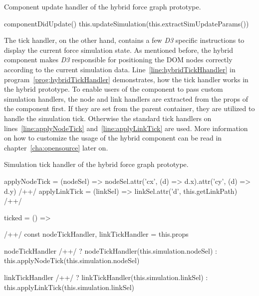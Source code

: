 \begin{program}
\caption{Component update handler of the hybrid force graph prototype.}
\label{prog:hybridUpdateHandler}
\begin{JsCode}
componentDidUpdate() {
  this.updateSimulation(this.extractSimUpdateParams())
}
\end{JsCode}
\end{program}

The tick handler, on the other hand, contains a few \emph{D3} specific instructions to display the current force simulation state. As mentioned before, the hybrid component makes \emph{D3} responsible for positioning the DOM nodes correctly according to the current simulation data. Line~\ref{line:hybridTickHhandler} in program~\ref{prog:hybridTickHandler} demonstrates, how the tick handler works in the hybrid prototype. To enable users of the component to pass custom simulation handlers, the node and link handlers are extracted from the props of the component first. If they are set from the parent container, they are utilized to handle the simulation tick. Otherwise the standard tick handlers on lines~\ref{line:applyNodeTick} and~\ref{line:applyLinkTick} are used. More information on how to customize the usage of the hybrid component can be read in chapter~\ref{cha:opensource} later on.

\begin{program}
\caption{Simulation tick handler of the hybrid force graph prototype.}
\label{prog:hybridTickHandler}
\begin{JsCode}
applyNodeTick = (nodeSel) => nodeSel.attr('cx', (d) => d.x).attr('cy', (d) => d.y) /+\label{line:applyNodeTick}+/
applyLinkTick = (linkSel) => linkSel.attr('d', this.getLinkPath) /+\label{line:applyLinkTick}+/

ticked = () => { /+\label{line:hybridTickHhandler}+/
  const { nodeTickHandler, linkTickHandler } = this.props

  nodeTickHandler /+\label{line:decideNodeTickHandler}+/
    ? nodeTickHandler(this.simulation.nodeSel)
    : this.applyNodeTick(this.simulation.nodeSel)

  linkTickHandler /+\label{line:decideLinkTickHandler}+/
    ? linkTickHandler(this.simulation.linkSel)
    : this.applyLinkTick(this.simulation.linkSel)
}
\end{JsCode}
\end{program}

